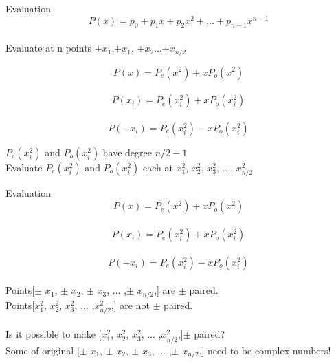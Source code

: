 \documentclass{beamer}
\begin{document}
	

	


       \begin{frame}{Evaluation}
             $$P(x) = p_0 + p_1x 
 + p_2x^2 + ... + p_{n-1}x^{n-1}$$\\

 Evaluate at n points $\pm x_1$,$\pm x_1$, $\pm x_2$...$\pm x_{n/2}$\ 

 $$P(x) = P_e(x^2) + xP_o(x^2)$$\\
$$P(x_i) = P_e(x_i^2) + xP_o(x_i^2)$$\\
$$P(-x_i) = P_e(x_i^2) - xP_o(x_i^2)$$

$P_e(x_i^2)$ and $P_o(x_i^2)$ have degree $n/2 - 1$ \\ 
\vspace{0.5cm}
Evaluate $P_e(x_i^2)$ and $P_o(x_i^2)$ each at $ x_1^2$, $ x_2^2$, $ x_3^2$, ..., $x_{n/2}^2$
 
           
       \end{frame}


       \begin{frame}{Evaluation}
        $$P(x) = P_e(x^2) + xP_o(x^2)$$\\
$$P(x_i) = P_e(x_i^2) + xP_o(x_i^2)$$\\
$$P(-x_i) = P_e(x_i^2) - xP_o(x_i^2)$$\\
       Points[$\pm$ $x_1$, $\pm$ $x_2$, $\pm$ $x_3$, ... ,$\pm$ $x_{n/2}$,] are $\pm$ paired.\\
       \vspace{0.5cm}
       Points[$x_1^2$, $x_2^2$, $x_3^2$, ... ,$x_{n/2}^2$,] are not $\pm$ paired.\\

       \centering
       \vspace{0.5cm}
       \pause
      \color{red}{Recursion breaks!!!}\\
       \vspace{0.5cm}
       Is it possible to make [$x_1^2$, $x_2^2$, $x_3^2$, ... ,$x_{n/2}^2$,]$\pm$ paired?\\
    \pause
       Some of original [$\pm$ $x_1$, $\pm$ $x_2$, $\pm$ $x_3$, ... ,$\pm$ $x_{n/2}$,] need to be complex numbers!
       
       \end{frame}
\end{document}
